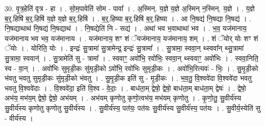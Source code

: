 \documentclass[17pt]{extarticle}
\begin{document}
30. वृ॒त्र॒हेति॑ वृत्र - हा । . सो॒म॒पावेति॑ सोम - पावा᳚ । . अ॒स्मिन्. य॒ज्ञे य॒ज्ञे अ॒स्मिन् न॒स्मिन्. य॒ज्ञे । . य॒ज्ञे ब॒र्॒.हिषि॑ ब॒र्॒.हिषि॑ य॒ज्ञे य॒ज्ञे ब॒र्॒.हिषि॑ । . ब॒र्॒.हिष्या ब॒र्॒.हिषि॑ ब॒र्॒.हिष्या । . आ नि॒षद्य॑ नि॒षद्या नि॒षद्य॑ । . नि॒षद्याथाथ॑ नि॒षद्य॑ नि॒षद्याथ॑ । . नि॒षद्येति॑ नि - सद्य॑ । . अथा॑ भव भ॒वाथाथा॑ भव । . भ॒व॒ यज॑मानाय॒ यज॑मानाय भव भव॒ यज॑मानाय । . यज॑मानाय॒ शꣳ शं ॅयज॑मानाय॒ यज॑मानाय॒ शम् । . शं ॅयोर् योः शꣳ शं ॅयोः । . योरिति॒ योः । . इन्द्रः॑ सु॒त्रामा॑ सु॒त्रामेन्द्र॒ इन्द्रः॑ सु॒त्रामा᳚ । . सु॒त्रामा॒ स्ववा॒न् थ्स्ववा᳚न् थ्सु॒त्रामा॑ सु॒त्रामा॒ स्ववान्॑ । . सु॒त्रामेति॑ सु - त्रामा᳚ । . स्ववाꣳ॒॒ अवो॑भि॒ रवो॑भिः॒ स्ववा॒न् थ्स्ववाꣳ॒॒ अवो॑भिः । . स्ववा॒निति॒ स्व - वा॒न् । . अवो॑भिः सुमृडी॒कः सु॑मृडी॒को ऽवो॑भि॒ रवो॑भिः सुमृडी॒कः । . अवो॑भि॒रित्यवः॑ - भिः॒ । . सु॒मृ॒डी॒को भ॑वतु भवतु सुमृडी॒कः सु॑मृडी॒को भ॑वतु । . सु॒मृ॒डी॒क इति॑ सु - मृ॒डी॒कः । . भ॒व॒तु॒ वि॒श्ववे॑दा वि॒श्ववे॑दा भवतु भवतु वि॒श्ववे॑दाः । . वि॒श्ववे॑दा॒ इति॑ वि॒श्व - वे॒दाः॒ । . बाध॑ता॒म् द्वेषो॒ द्वेषो॒ बाध॑ता॒म् बाध॑ता॒म् द्वेषः॑ । . द्वेषो॒ अभ॑य॒ मभ॑य॒म् द्वेषो॒ द्वेषो॒ अभ॑यम् । . अभ॑यम् कृणोतु कृणो॒त्वभ॑य॒ मभ॑यम् कृणोतु । . कृ॒णो॒तु॒ सु॒वीर्य॑स्य सु॒वीर्य॑स्य कृणोतु कृणोतु सु॒वीर्य॑स्य । . सु॒वीर्य॑स्य॒ पत॑यः॒ पत॑यः सु॒वीर्य॑स्य सु॒वीर्य॑स्य॒ पत॑यः । . सु॒वीर्य॒स्येति॑ सु - वीर्य॑स्य । \newline
\end{document}
